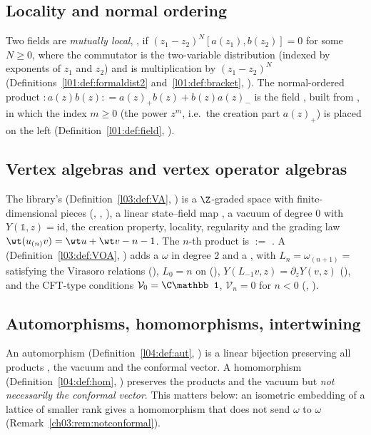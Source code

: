 \subsection{Locality and normal ordering}

Two fields are \emph{mutually local}, , if
$(z_1-z_2)^N[a(z_1),b(z_2)]=0$ for some $N\ge0$, where the commutator is the two-variable
distribution  (indexed by exponents of $z_1$ and $z_2$) and
 is multiplication by $(z_1-z_2)^N$ (Definitions~\ref{l01:def:formaldist2}
and~\ref{l01:def:bracket}, ). The normal-ordered product
${:}a(z)b(z){:}=a(z)_+b(z)+b(z)a(z)_-$ is the field , built from
, in which the index $m\ge0$ (the power $z^m$, i.e.\ the creation part
$a(z)_+$) is placed on the left (Definition~\ref{l01:def:field}, ).

\subsection{Vertex algebras and vertex operator algebras}

The library's  (Definition~\ref{l03:def:VA},
) is a $\Z$-graded space with finite-dimensional pieces
(, , ), a linear state--field map
, a vacuum of degree $0$ with $Y(\mathbb1,z)=\mathrm{id}$, the
creation property, locality, regularity and the grading law $\wt(u_{(n)}v)=\wt u+\wt v-n-1$. The
$n$-th product is  $:=$ . A
 (Definition~\ref{l03:def:VOA},
) adds a  $\omega$ in degree
$2$ and a , with $L_n=\omega_{(n+1)}=$ 
satisfying the Virasoro relations (), $L_0=n$ on 
(), $Y(L_{-1}v,z)=\partial_zY(v,z)$ (), and the CFT-type
conditions $\mathcal V_0=\C\mathbb1$, $\mathcal V_n=0$ for $n<0$ (,
).

\subsection{Automorphisms, homomorphisms, intertwining}

An automorphism  (Definition~\ref{l04:def:aut}, )
is a linear bijection preserving all products , the vacuum and the conformal
vector. A homomorphism  (Definition~\ref{l04:def:hom},
) preserves the products and the vacuum but \emph{not
necessarily the conformal vector}. This matters below: an isometric embedding of a lattice of
smaller rank gives a homomorphism that does not send $\omega$ to $\omega$
(Remark~\ref{ch03:rem:notconformal}).


